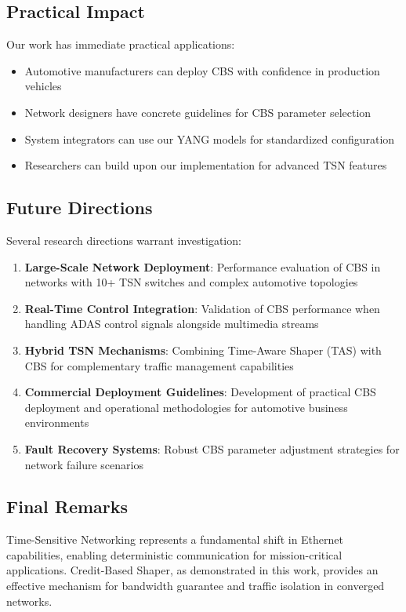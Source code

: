 \documentclass[10pt, journal, compsoc]{IEEEtran}
\begin{document}
\subsection{Practical Impact}

Our work has immediate practical applications:
\begin{itemize}
    \item Automotive manufacturers can deploy CBS with confidence in production vehicles
    \item Network designers have concrete guidelines for CBS parameter selection
    \item System integrators can use our YANG models for standardized configuration
    \item Researchers can build upon our implementation for advanced TSN features
\end{itemize}

\subsection{Future Directions}

Several research directions warrant investigation:

\begin{enumerate}
    \item \textbf{Large-Scale Network Deployment}: Performance evaluation of CBS in networks with 10+ TSN switches and complex automotive topologies
    \item \textbf{Real-Time Control Integration}: Validation of CBS performance when handling ADAS control signals alongside multimedia streams
    \item \textbf{Hybrid TSN Mechanisms}: Combining Time-Aware Shaper (TAS) with CBS for complementary traffic management capabilities
    \item \textbf{Commercial Deployment Guidelines}: Development of practical CBS deployment and operational methodologies for automotive business environments
    \item \textbf{Fault Recovery Systems}: Robust CBS parameter adjustment strategies for network failure scenarios
\end{enumerate}

\subsection{Final Remarks}

Time-Sensitive Networking represents a fundamental shift in Ethernet capabilities, enabling deterministic communication for mission-critical applications. Credit-Based Shaper, as demonstrated in this work, provides an effective mechanism for bandwidth guarantee and traffic isolation in converged networks.
\end{document}
